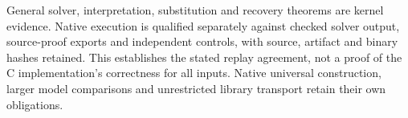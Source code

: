 \documentclass[11pt]{article}
\begin{document}
General solver, interpretation, substitution and recovery theorems are
kernel evidence. Native execution is qualified separately against checked
solver output, source-proof exports and independent controls, with source,
artifact and binary hashes retained. This establishes the stated replay
agreement, not a proof of the C implementation's correctness for all inputs.
Native universal construction, larger model comparisons and unrestricted
library transport retain their own obligations.
\end{document}
